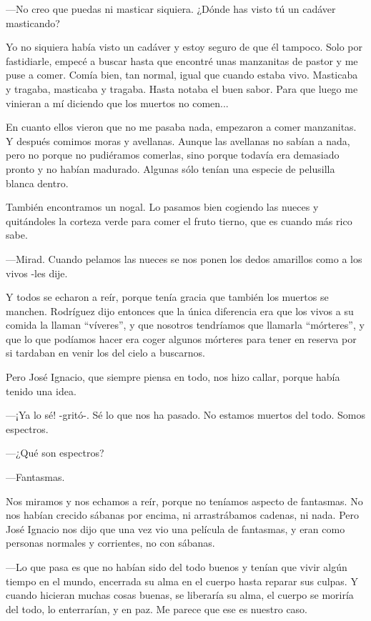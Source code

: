 \documentclass{barcodevapor3pags}
\begin{document}
---No creo que puedas ni masticar siquiera. ¿Dónde has visto tú un
cadáver masticando?~

Yo no siquiera había visto un cadáver y estoy seguro de que él tampoco.
Solo por fastidiarle, empecé a buscar hasta que encontré unas manzanitas
de pastor y me puse a comer. Comía bien, tan normal, igual que cuando
estaba vivo. Masticaba y tragaba, masticaba y tragaba. Hasta notaba el
buen sabor. Para que luego me vinieran a mí diciendo que los muertos no
comen...~

En cuanto ellos vieron que no me pasaba nada, empezaron a comer
manzanitas. Y después comimos moras y avellanas. Aunque las avellanas no
sabían a nada, pero no porque no pudiéramos comerlas, sino porque
todavía era demasiado pronto y no habían madurado. Algunas sólo tenían
una especie de pelusilla blanca dentro.~

También encontramos un nogal. Lo pasamos bien cogiendo las nueces y
quitándoles la corteza verde para comer el fruto tierno, que es cuando
más rico sabe.~

---Mirad. Cuando pelamos las nueces se nos ponen los dedos amarillos
como a los vivos -les dije.~

Y todos se echaron a reír, porque tenía gracia que también los muertos
se manchen. Rodríguez dijo entonces que la única diferencia era que los
vivos a su comida la llaman ``víveres'', y que nosotros tendríamos que
llamarla ``mórteres'', y que lo que podíamos hacer era coger algunos
mórteres para tener en reserva por si tardaban en venir los del cielo a
buscarnos.~

Pero José Ignacio, que siempre piensa en todo, nos hizo callar, porque
había tenido una idea.~

---¡Ya lo sé! -gritó-. Sé lo que nos ha pasado. No estamos muertos del
todo. Somos espectros.~

---¿Qué son espectros?~

---Fantasmas.~

Nos miramos y nos echamos a reír, porque no teníamos aspecto de
fantasmas. No nos habían crecido sábanas por encima, ni arrastrábamos
cadenas, ni nada. Pero José Ignacio nos dijo que una vez vio una
película de fantasmas, y eran como personas normales y corrientes, no
con sábanas.~

---Lo que pasa es que no habían sido del todo buenos y tenían que vivir
algún tiempo en el mundo, encerrada su alma en el cuerpo hasta reparar
sus culpas. Y cuando hicieran muchas cosas buenas, se liberaría su alma,
el cuerpo se moriría del todo, lo enterrarían, y en paz. Me parece que
ese es nuestro caso.~
\end{document}
